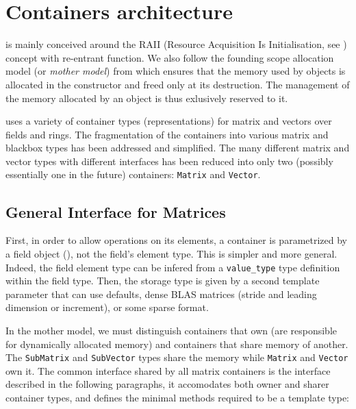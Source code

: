 \section{Containers architecture}\label{sec:container}
%
\linbox is mainly conceived around the RAII (Resource Acquisition Is
Initialisation, see \cite{stroustrup1994design}) concept with re-entrant
function. We also follow the {founding scope allocation} model (or \emph{mother
model}) from \cite{Dumas:2010:lbpar} which ensures that the memory used by
objects is allocated in the constructor and freed only at its destruction. The
management of the memory allocated by an object is thus exlusively reserved to it.
%
\par
%
\linbox uses a variety of container types (representations) for matrix and vectors over fields and rings.
The fragmentation of the containers into various matrix and
blackbox types has been addressed and simplified. The many different matrix and
vector types with different interfaces has been reduced into only two
(possibly essentially one in the future) containers: \texttt{Matrix} and
\texttt{Vector}.
%
\subsection{General Interface for %
Matrices}
%
First, in order to allow operations on its elements, a container is
parametrized by a field object (), not the field's element
type. This is simpler and more general.
Indeed, the field element type can be infered from a
\verb!value_type! type definition within the field type.
Then, the storage type is given by a second
template parameter that can use defaults,
\eg dense BLAS matrices (stride
and leading dimension or increment), or some sparse format.
%

%
In the mother model, we must distinguish containers that own (are responsible
for dynamically allocated memory) and containers that share memory of another.  The
\texttt{SubMatrix} and \texttt{SubVector} types share the memory while
\texttt{Matrix} and \texttt{Vector} own it.
%
The common interface shared by all matrix containers is the \applin  interface
described in the following paragraphs, it accomodates both owner and sharer
container types, and defines the minimal methods required to be a
template \applin type:
%
% 
%
%

